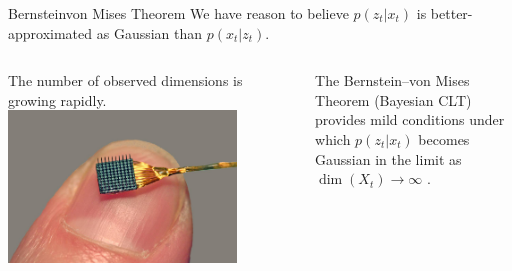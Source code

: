 \documentclass[aspectratio=169,19pt,xetex,handout]{beamer}
\begin{document}
\begin{frame}{Bernstein{\textendash}von Mises Theorem}
\Large
We have reason to believe $p(z_t|x_t)$ is better-approximated as Gaussian than $p(x_t|z_t)$.

\bigskip

\begin{columns}[T] %

The number of observed dimensions is growing rapidly.
\includegraphics[width=0.8\textwidth]{braingate6}


The Bernstein--von Mises Theorem (Bayesian CLT) provides mild conditions under which $p(z_t|x_t)$ becomes Gaussian in the limit as $\dim(X_t)\rightarrow\infty$ \cite{vdV98}.  

\end{columns}


\end{frame}

\end{document}
